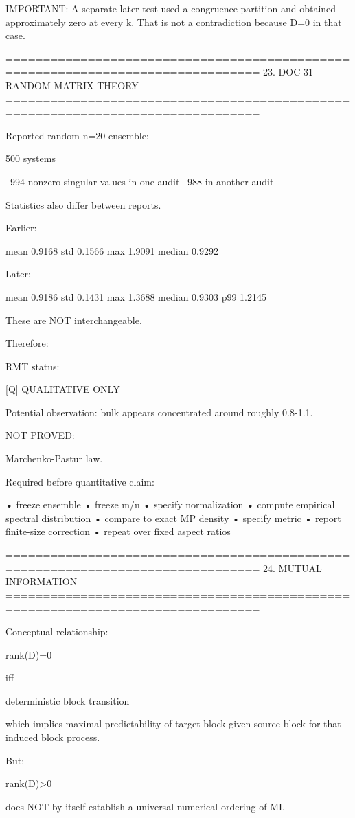 IMPORTANT:
A separate later test used a congruence partition and obtained approximately
zero at every k. That is not a contradiction because D=0 in that case.

================================================================================
23. DOC 31 — RANDOM MATRIX THEORY
================================================================================

Reported random n=20 ensemble:

500 systems

~994 nonzero singular values in one audit
~988 in another audit

Statistics also differ between reports.

Earlier:

mean   0.9168
std    0.1566
max    1.9091
median 0.9292

Later:

mean   0.9186
std    0.1431
max    1.3688
median 0.9303
p99    1.2145

These are NOT interchangeable.

Therefore:

RMT status:

[Q] QUALITATIVE ONLY

Potential observation:
bulk appears concentrated around roughly 0.8-1.1.

NOT PROVED:

Marchenko-Pastur law.

Required before quantitative claim:

  • freeze ensemble
  • freeze m/n
  • specify normalization
  • compute empirical spectral distribution
  • compare to exact MP density
  • specify metric
  • report finite-size correction
  • repeat over fixed aspect ratios

================================================================================
24. MUTUAL INFORMATION
================================================================================

Conceptual relationship:

rank(D)=0

iff

deterministic block transition

which implies maximal predictability of target block given source block
for that induced block process.

But:

rank(D)>0

does NOT by itself establish a universal numerical ordering of MI.

